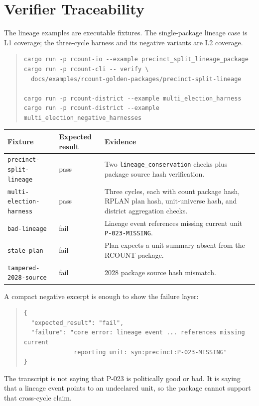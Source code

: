 \section{Verifier Traceability}

The lineage examples are executable fixtures. The single-package lineage case
is L1 coverage; the three-cycle harness and its negative variants are L2
coverage.

\begin{quote}
\footnotesize
\begin{verbatim}
cargo run -p rcount-io --example precinct_split_lineage_package
cargo run -p rcount-cli -- verify \
  docs/examples/rcount-golden-packages/precinct-split-lineage

cargo run -p rcount-district --example multi_election_harness
cargo run -p rcount-district --example multi_election_negative_harnesses
\end{verbatim}
\end{quote}

\begin{center}
\small
\begin{tabularx}{\textwidth}{lXX}
\toprule
Fixture & Expected result & Evidence \\
\midrule
\texttt{precinct-split-lineage} & pass & Two \texttt{lineage\_conservation} checks plus package source hash verification. \\
\texttt{multi-election-harness} & pass & Three cycles, each with count package hash, RPLAN plan hash, unit-universe hash, and district aggregation checks. \\
\texttt{bad-lineage} & fail & Lineage event references missing current unit \texttt{P-023-MISSING}. \\
\texttt{stale-plan} & fail & Plan expects a unit summary absent from the RCOUNT package. \\
\texttt{tampered-2028-source} & fail & 2028 package source hash mismatch. \\
\bottomrule
\end{tabularx}
\end{center}

A compact negative excerpt is enough to show the failure layer:
\begin{quote}
\footnotesize
\begin{verbatim}
{
  "expected_result": "fail",
  "failure": "core error: lineage event ... references missing current
              reporting unit: syn:precinct:P-023-MISSING"
}
\end{verbatim}
\end{quote}

The transcript is not saying that P-023 is politically good or bad. It is saying
that a lineage event points to an undeclared unit, so the package cannot support
that cross-cycle claim.
